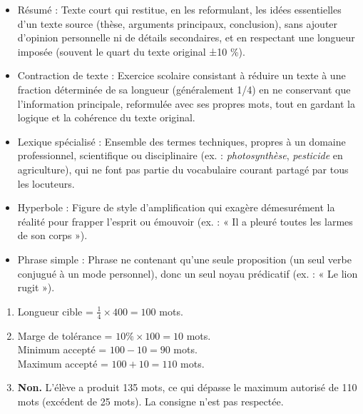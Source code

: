 \documentclass[11pt]{article}
\newcommand{\cle}[1]{{\popxbold\color{popdark}#1}}
\begin{document}
\begin{corrige}
\begin{itemize}
\item \cle{Résumé} : Texte court qui restitue, en les reformulant, les idées essentielles d'un texte source (thèse, arguments principaux, conclusion), sans ajouter d'opinion personnelle ni de détails secondaires, et en respectant une longueur imposée (souvent le quart du texte original ±10 \%).
\item \cle{Contraction de texte} : Exercice scolaire consistant à réduire un texte à une fraction déterminée de sa longueur (généralement 1/4) en ne conservant que l'information principale, reformulée avec ses propres mots, tout en gardant la logique et la cohérence du texte original.
\item \cle{Lexique spécialisé} : Ensemble des termes techniques, propres à un domaine professionnel, scientifique ou disciplinaire (ex. : \emph{photosynthèse}, \emph{pesticide} en agriculture), qui ne font pas partie du vocabulaire courant partagé par tous les locuteurs.
\item \cle{Hyperbole} : Figure de style d'amplification qui exagère démesurément la réalité pour frapper l'esprit ou émouvoir (ex. : « Il a pleuré toutes les larmes de son corps »).
\item \cle{Phrase simple} : Phrase ne contenant qu'une seule proposition (un seul verbe conjugué à un mode personnel), donc un seul noyau prédicatif (ex. : « Le lion rugit »).
\end{itemize}
\end{corrige}

\begin{corrige}
\begin{enumerate}
\item Longueur cible = $\frac{1}{4} \times 400 = 100$ mots.
\item Marge de tolérance = $10\% \times 100 = 10$ mots.\\
  Minimum accepté = $100 - 10 = 90$ mots.\\
  Maximum accepté = $100 + 10 = 110$ mots.
\item \textbf{Non.} L'élève a produit 135 mots, ce qui dépasse le maximum autorisé de 110 mots (excédent de 25 mots). La consigne n'est pas respectée.
\end{enumerate}
\end{corrige}
\end{document}
